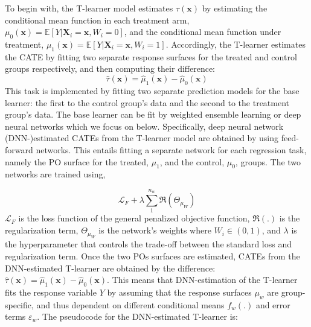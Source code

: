 To begin with, the T-learner model estimates
\(\tau\left(\mathbf{x}\right)\) by estimating the conditional mean
function in each treatment arm,
\(\mu_{0}\left(\mathbf{x}\right)=\mathbb{E}\left[ Y|\mathbf{X}_{i}=\mathbf{x}, W_{i}=0\right]\),
and the conditional mean function under treatment,
\(\mu_{1}\left(\mathbf{x}\right)=\mathbb{E}\left[ Y|\mathbf{X}_{i}=\mathbf{x}, W_{i}=1 \right]\).
Accordingly, the T-learner estimates the CATE by fitting two separate
response surfaces for the treated and control groups respectively, and
then computing their difference: \begin{equation}
\widehat{\tau}\left(\mathbf{x}\right)=\widehat{\mu}_{1}\left(\mathbf{x}\right)-\widehat{\mu}_{0}\left(\mathbf{x}\right)
\end{equation} This task is implemented by fitting two separate
prediction models for the base learner: the first to the control group's
data and the second to the treatment group's data. The base learner can
be fit by weighted ensemble learning or deep neural networks which we
focus on below. Specifically, deep neural network (DNN-)estimated CATEs
from the T-learner model are obtained by using feed-forward networks.
This entails fitting a separate network for each regression task, namely
the PO surface for the treated, \(\mu_{1}\), and the control, \(\mu_{0}\),
groups. The two networks are trained using,

\begin{equation}
\mathcal{L}_{F}+\lambda\sum\limits_{1}^{n_w}\Re\left(\Theta_{\mu_{W}}\right)
\end{equation}
\(\mathcal{L}_{F}\) is the loss function of the general penalized
objective function, \(\mathcal{\mathcal{\Re}}\left(.\right)\) is the
regularization term, \(\Theta_{\mu_{W}}\) is the network's weights where
\(W_{i}\in\left(0,1\right)\), and \(\lambda\) is the hyperparameter that
controls the trade-off between the standard loss and regularization
term. Once the two POs surfaces are estimated, CATEs from the
DNN-estimated T-learner are obtained by the difference:
\(\widehat{\tau}\left(\mathbf{x}\right)=\widehat{\mu}_{1}\left(\mathbf{x}\right)-\widehat{\mu}_{0} \left(\mathbf{x}\right)\).
This means that DNN-estimation of the T-learner fits the response
variable \(Y\) by assuming that the response surfaces \(\mu_{w}\) are
group-specific, and thus dependent on different conditional means
\(f_{w}\left(.\right)\) and error terms \(\varepsilon_{w}\). The pseudocode
for the DNN-estimated T-learner is:

